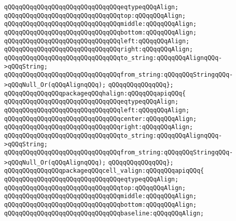 \verb|qQQqqQQqqQQqqQQqqQQqqQQqqQQqqQQqeqtypeqQQqAlign;|\newline
\verb|qQQqqQQqqQQqqQQqqQQqqQQqqQQqqQQqtop:qQQqqQQqAlign;|\newline
\verb|qQQqqQQqqQQqqQQqqQQqqQQqqQQqqQQqmiddle:qQQqqQQqAlign;|\newline
\verb|qQQqqQQqqQQqqQQqqQQqqQQqqQQqqQQqbottom:qQQqqQQqAlign;|\newline
\verb|qQQqqQQqqQQqqQQqqQQqqQQqqQQqqQQqleft:qQQqqQQqAlign;|\newline
\verb|qQQqqQQqqQQqqQQqqQQqqQQqqQQqqQQqright:qQQqqQQqAlign;|\newline
\verb|qQQqqQQqqQQqqQQqqQQqqQQqqQQqqQQqto_string:qQQqqQQqAlignqQQq->qQQqString;|\newline
\verb|qQQqqQQqqQQqqQQqqQQqqQQqqQQqqQQqfrom_string:qQQqqQQqStringqQQq->qQQqNull_Or(qQQqAlignqQQq);|\newline
\verb|qQQqqQQqqQQqqQQq};|\newline
\newline
\verb|qQQqqQQqqQQqqQQqpackageqQQqhalign:qQQqqQQqapiqQQq{|\newline
\verb|qQQqqQQqqQQqqQQqqQQqqQQqqQQqqQQqeqtypeqQQqAlign;|\newline
\verb|qQQqqQQqqQQqqQQqqQQqqQQqqQQqqQQqleft:qQQqqQQqAlign;|\newline
\verb|qQQqqQQqqQQqqQQqqQQqqQQqqQQqqQQqcenter:qQQqqQQqAlign;|\newline
\verb|qQQqqQQqqQQqqQQqqQQqqQQqqQQqqQQqright:qQQqqQQqAlign;|\newline
\verb|qQQqqQQqqQQqqQQqqQQqqQQqqQQqqQQqto_string:qQQqqQQqAlignqQQq->qQQqString;|\newline
\verb|qQQqqQQqqQQqqQQqqQQqqQQqqQQqqQQqfrom_string:qQQqqQQqStringqQQq->qQQqNull_Or(qQQqAlignqQQq);|\newline
\verb|qQQqqQQqqQQqqQQq};|\newline
\newline
\verb|qQQqqQQqqQQqqQQqpackageqQQqcell_valign:qQQqqQQqapiqQQq{|\newline
\verb|qQQqqQQqqQQqqQQqqQQqqQQqqQQqqQQqeqtypeqQQqAlign;|\newline
\verb|qQQqqQQqqQQqqQQqqQQqqQQqqQQqqQQqtop:qQQqqQQqAlign;|\newline
\verb|qQQqqQQqqQQqqQQqqQQqqQQqqQQqqQQqmiddle:qQQqqQQqAlign;|\newline
\verb|qQQqqQQqqQQqqQQqqQQqqQQqqQQqqQQqbottom:qQQqqQQqAlign;|\newline
\verb|qQQqqQQqqQQqqQQqqQQqqQQqqQQqqQQqbaseline:qQQqqQQqAlign;|\newline
